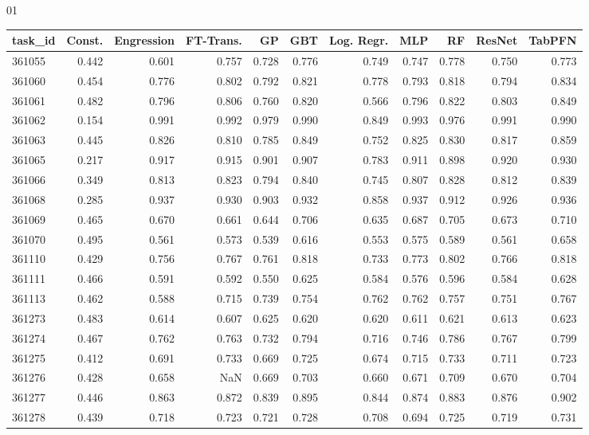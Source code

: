 01\begin{tabular}{lrrrrrrrrrr}
\toprule
task\_id & Const. & Engression & FT-Trans. & GP & GBT & Log. Regr. & MLP & RF & ResNet & TabPFN \\
\midrule
361055 & 0.442 & 0.601 & 0.757 & 0.728 & 0.776 & 0.749 & 0.747 & 0.778 & 0.750 & 0.773 \\
361060 & 0.454 & 0.776 & 0.802 & 0.792 & 0.821 & 0.778 & 0.793 & 0.818 & 0.794 & 0.834 \\
361061 & 0.482 & 0.796 & 0.806 & 0.760 & 0.820 & 0.566 & 0.796 & 0.822 & 0.803 & 0.849 \\
361062 & 0.154 & 0.991 & 0.992 & 0.979 & 0.990 & 0.849 & 0.993 & 0.976 & 0.991 & 0.990 \\
361063 & 0.445 & 0.826 & 0.810 & 0.785 & 0.849 & 0.752 & 0.825 & 0.830 & 0.817 & 0.859 \\
361065 & 0.217 & 0.917 & 0.915 & 0.901 & 0.907 & 0.783 & 0.911 & 0.898 & 0.920 & 0.930 \\
361066 & 0.349 & 0.813 & 0.823 & 0.794 & 0.840 & 0.745 & 0.807 & 0.828 & 0.812 & 0.839 \\
361068 & 0.285 & 0.937 & 0.930 & 0.903 & 0.932 & 0.858 & 0.937 & 0.912 & 0.926 & 0.936 \\
361069 & 0.465 & 0.670 & 0.661 & 0.644 & 0.706 & 0.635 & 0.687 & 0.705 & 0.673 & 0.710 \\
361070 & 0.495 & 0.561 & 0.573 & 0.539 & 0.616 & 0.553 & 0.575 & 0.589 & 0.561 & 0.658 \\
361110 & 0.429 & 0.756 & 0.767 & 0.761 & 0.818 & 0.733 & 0.773 & 0.802 & 0.766 & 0.818 \\
361111 & 0.466 & 0.591 & 0.592 & 0.550 & 0.625 & 0.584 & 0.576 & 0.596 & 0.584 & 0.628 \\
361113 & 0.462 & 0.588 & 0.715 & 0.739 & 0.754 & 0.762 & 0.762 & 0.757 & 0.751 & 0.767 \\
361273 & 0.483 & 0.614 & 0.607 & 0.625 & 0.620 & 0.620 & 0.611 & 0.621 & 0.613 & 0.623 \\
361274 & 0.467 & 0.762 & 0.763 & 0.732 & 0.794 & 0.716 & 0.746 & 0.786 & 0.767 & 0.799 \\
361275 & 0.412 & 0.691 & 0.733 & 0.669 & 0.725 & 0.674 & 0.715 & 0.733 & 0.711 & 0.723 \\
361276 & 0.428 & 0.658 & NaN & 0.669 & 0.703 & 0.660 & 0.671 & 0.709 & 0.670 & 0.704 \\
361277 & 0.446 & 0.863 & 0.872 & 0.839 & 0.895 & 0.844 & 0.874 & 0.883 & 0.876 & 0.902 \\
361278 & 0.439 & 0.718 & 0.723 & 0.721 & 0.728 & 0.708 & 0.694 & 0.725 & 0.719 & 0.731 \\

\end{tabular}
